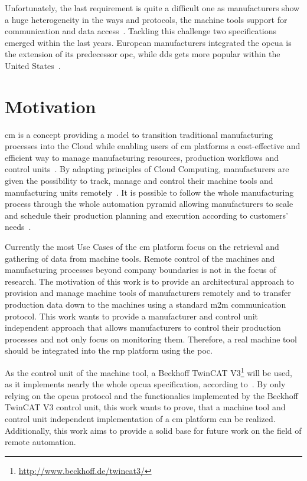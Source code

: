 \documentclass[
a4paper,
twoside,
headsepline,
cleardoublepage=empty,
parskip=half,
draft=false
]{scrbook}
\begin{document}
		Unfortunately, the last requirement is quite a difficult one as manufacturers show a huge heterogeneity in the ways and protocols, the machine tools support for communication and data access~\cite{xu2012cloud}.
		Tackling this challenge two specifications emerged within the last years.
		European manufacturers integrated the \gls{opcua} is the extension of its predecessor \gls{opc}, while \gls{dds} gets more popular within the United States~\cite{niggemann2015data}.

		\section{Motivation}\label{sec:motivation}

			\gls{cm} is a concept providing a model to transition traditional manufacturing processes into the Cloud while enabling users of \gls{cm} platforms a cost-effective and efficient way to manage manufacturing resources, production workflows and control units~\cite{xu2012cloud}.
			By adapting principles of Cloud Computing, manufacturers are given the possibility to track, manage and control their machine tools and manufacturing units remotely~\cite{wu2013cloud}.
			It is possible to follow the whole manufacturing process through the whole automation pyramid allowing manufacturers to scale and schedule their production planning and execution according to customers' needs~\cite{kleinemeier2014automatisierungspyramide}.

			Currently the most Use Cases of the \gls{cm} platform focus on the retrieval and gathering of data from machine tools.
			Remote control of the machines and manufacturing processes beyond company boundaries is not in the focus of research.
			The motivation of this work is to provide an architectural approach to provision and manage machine tools of manufacturers remotely and to transfer production data down to the machines using a standard \gls{m2m} communication protocol.
			This work wants to provide a manufacturer and control unit independent approach that allows manufacturers to control their production processes and not only focus on monitoring them. Therefore, a real machine tool should be integrated into the \gls{rnp} platform using the \gls{poc}.
			
			As the control unit of the machine tool, a Beckhoff TwinCAT V3\footnote{\url{http://www.beckhoff.de/twincat3/}} will be used, as it implements nearly the whole \gls{opcua} specification, according to~\cite{twincat2018}.
			By only relying on the \gls{opcua} protocol and the functionalies implemented by the Beckhoff TwinCAT V3 control unit, this work wants to prove, that a machine tool and control unit independent implementation of a \gls{cm} platform can be realized.
			Additionally, this work aims to provide a solid base for future work on the field of remote automation.
\end{document}
